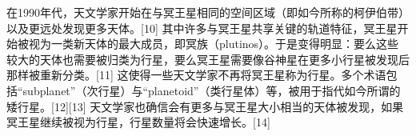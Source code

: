 在1990年代，天文学家开始在与冥王星相同的空间区域（即如今所称的柯伊伯带）以及更远处发现更多天体。[10] 其中许多与冥王星共享关键的轨道特征，冥王星开始被视为一类新天体的最大成员，即冥族（plutinos）。于是变得明显：要么这些较大的天体也需要被归类为行星，要么冥王星需要像谷神星在更多小行星被发现后那样被重新分类。[11] 这使得一些天文学家不再将冥王星称为行星。多个术语包括“subplanet”（次行星）与“planetoid”（类行星体）等，被用于指代如今所谓的矮行星。[12][13] 天文学家也确信会有更多与冥王星大小相当的天体被发现，如果冥王星继续被视为行星，行星数量将会快速增长。[14]

